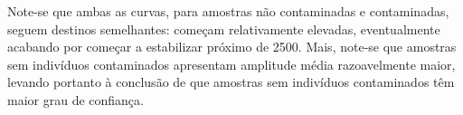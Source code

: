 \documentclass[11pt]{article}
\begin{document}

Note-se que ambas as curvas, para amostras não contaminadas e contaminadas,
seguem destinos semelhantes: começam relativamente elevadas, eventualmente
acabando por começar a estabilizar próximo de 2500. Mais, note-se que amostras
sem indivíduos contaminados apresentam amplitude média razoavelmente maior, levando
portanto à conclusão de que amostras sem indivíduos contaminados têm maior grau de confiança.
\end{document}
